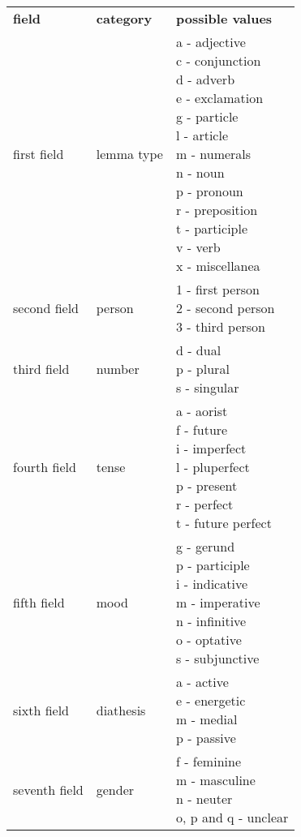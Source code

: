 \begin{table}
  \begin{tabular}{|l|l|l|}
    \hline
    \textbf{field}            & \textbf{category} & \textbf{possible values} \\ \thickhline
    first field  & lemma type & \specialcell{a - adjective\\c - conjunction\\d - adverb\\e - exclamation\\g - particle\\l - article\\m - numerals\\n - noun\\p - pronoun\\r - preposition\\t - participle\\v - verb\\x - miscellanea} \\ \hline
    second field & person & \specialcell{1 - first person\\2 - second person\\3 - third person} \\ \hline
    third field  & number & \specialcell{d - dual\\p - plural\\s - singular} \\ \hline
    fourth field & tense & \specialcell{a - aorist\\f - future\\i - imperfect\\l - pluperfect\\p - present\\r - perfect\\t - future perfect} \\ \hline
    fifth field & mood & \specialcell{g - gerund \\ p - participle \\ i - indicative\\m - imperative\\n - infinitive\\o - optative\\s - subjunctive} \\ \hline
    sixth field & diathesis & \specialcell{a - active\\e - energetic\\m - medial\\p - passive} \\ \hline
    seventh field & gender & \specialcell{f - feminine\\m - masculine\\n - neuter\\ o, p and q - unclear} \\ \hline

\end{tabular}
\end{table}
